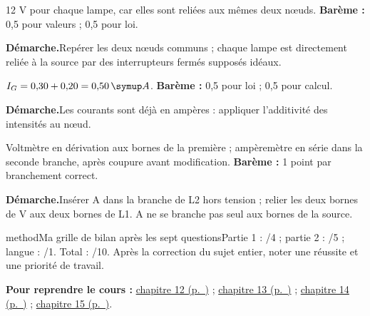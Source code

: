 \label{cor-bb-3}
\par\noindent\begin{minipage}{\linewidth}
12 V pour chaque lampe, car elles sont reliées aux mêmes deux nœuds. \textbf{Barème :} 0,5 pour valeurs ; 0,5 pour loi.\par
\smallskip\noindent\textbf{Démarche.}\enspace Repérer les deux nœuds communs ; chaque lampe est directement reliée à la source par des interrupteurs fermés supposés idéaux.\par
\end{minipage}\par
\par\noindent\begin{minipage}{\linewidth}
$I_G=0{,}30+0{,}20=0{,}50\unite A$. \textbf{Barème :} 0,5 pour loi ; 0,5 pour calcul.\par
\smallskip\noindent\textbf{Démarche.}\enspace Les courants sont déjà en ampères : appliquer l’additivité des intensités au nœud.\par
\end{minipage}\par
\par\noindent\begin{minipage}{\linewidth}
Voltmètre en dérivation aux bornes de la première ; ampèremètre en série dans la seconde branche, après coupure avant modification. \textbf{Barème :} 1 point par branchement correct.\par
\smallskip\noindent\textbf{Démarche.}\enspace Insérer A dans la branche de L2 hors tension ; relier les deux bornes de V aux deux bornes de L1. A ne se branche pas seul aux bornes de la source.\par
{}
\end{minipage}\par
\par\noindent\begin{minipage}{\linewidth}
\begin{pcEncadre}{method}{Ma grille de bilan après les sept questions}Partie 1 : /4 ; partie 2 : /5 ; langue : /1. Total : /10. Après la correction du sujet entier, noter une réussite et une priorité de travail.\end{pcEncadre}
{\small\textbf{Pour reprendre le cours : }\hyperref[chap-12]{chapitre 12 (p.~\pageref*{chap-12})} ; \hyperref[chap-13]{chapitre 13 (p.~\pageref*{chap-13})} ; \hyperref[chap-14]{chapitre 14 (p.~\pageref*{chap-14})} ; \hyperref[chap-15]{chapitre 15 (p.~\pageref*{chap-15})}.\par}\end{minipage}\par
